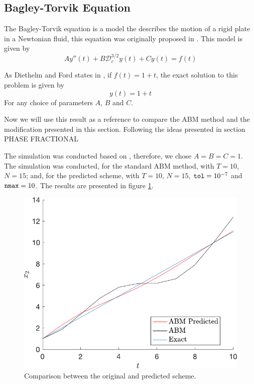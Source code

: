 \subsection{Bagley-Torvik Equation}
The Bagley-Torvik equation is a model the describes the motion of a rigid plate in a Newtonian fluid, this equation was originally proposed in \cite{torvik1984appearance}. This model is given by
\begin{equation}
    Ay''(t)+B\mathcal{D}_c^{3/2}y(t)+Cy(t)=f(t)
\end{equation}

As Diethelm and Ford states in \cite{diethelm2002numerical}, if $f(t)=1+t$, the exact solution to this problem is given by
\begin{equation}
    y(t)=1+t
\end{equation}
For any choice of parameters $A$, $B$ and $C$.

Now we will use this result as a reference to compare the ABM method and the modification presented in this section. Following the ideas presented in section PHASE FRACTIONAL

The simulation was conducted based on \cite{diethelm2002numerical}, therefore, we chose $A=B=C=1$. The simulation was conducted, for the standard ABM method, with $T=10$, $N=15$; and, for the predicted scheme, with $T=10$, $N=15$, $\text{\texttt{tol}}=10^{-7}$ and $\text{\texttt{nmax}}=10$. The results are presented in figure \ref{fig:comparBagleyTorvik}.


\begin{figure}[H]
    \centering
    \includegraphics[scale=0.5]{files/comparPredictedABM.pdf}
    \caption{Comparison between the original and predicted scheme.}
    \label{fig:comparBagleyTorvik}
\end{figure}
